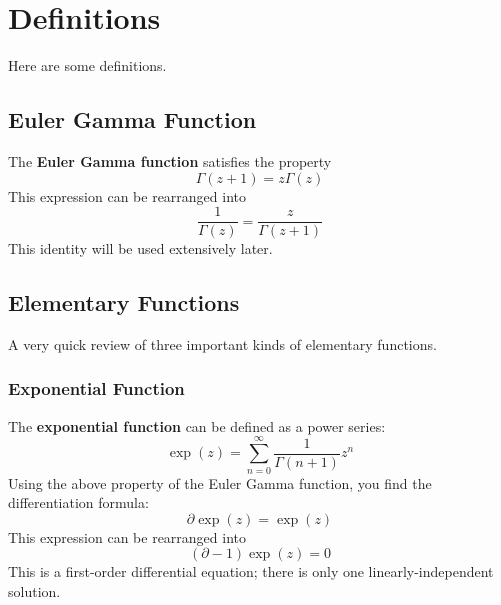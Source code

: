 \chapter{Definitions}
Here are some definitions.
\section{Euler Gamma Function}
The \textbf{Euler Gamma function} satisfies the property
\begin{equation}
    \Gamma(z + 1) = z \Gamma(z)
\end{equation}
This expression can be rearranged into
\begin{equation}
    \frac{1}{\Gamma(z)} = \frac{z}{\Gamma(z + 1)}
\end{equation}
This identity will be used extensively later.
\section{Elementary Functions}
A very quick review of three important kinds of elementary functions.
\subsection{Exponential Function}
The \textbf{exponential function} can be defined as a power series:
\begin{equation}
    \exp(z) = \sum_{n = 0}^{\infty} \frac{1}{\Gamma(n + 1)} z^{n}
\end{equation}
Using the above property of the Euler Gamma function, you find the differentiation formula:
\begin{equation}
    \partial \exp(z) = \exp(z)
\end{equation}
This expression can be rearranged into
\begin{equation}
    \left( \partial - 1 \right) \exp(z) = 0
\end{equation}
This is a first-order differential equation; there is only one linearly-independent solution.


